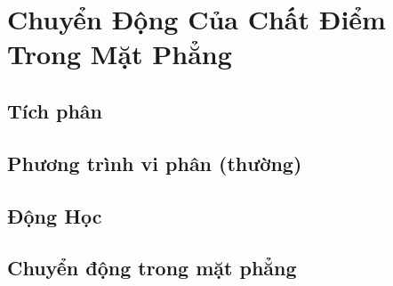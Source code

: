   
\chapter{Chuyển Động Của Chất Điểm Trong Mặt Phẳng}


\section{Tích phân}

\section{Phương trình vi phân (thường)}
\section{Động Học}

\section{Chuyển động trong mặt phẳng}
